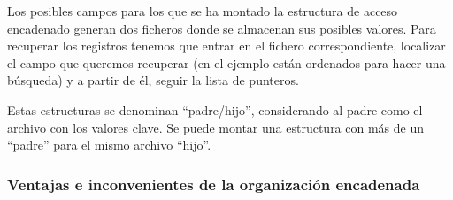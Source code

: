 \documentclass[10pt,a4paper,spanish]{report}
\begin{document}
Los posibles campos para los que se ha montado la estructura de acceso encadenado generan dos ficheros donde se almacenan sus posibles valores. Para recuperar los registros tenemos que entrar en el fichero correspondiente, localizar el campo que queremos recuperar (en el ejemplo están ordenados para hacer una búsqueda) y a partir de él, seguir la lista de punteros.

Estas estructuras se denominan ``padre/hijo'', considerando al padre como el archivo con los valores clave. Se puede montar una estructura con más de un ``padre'' para el mismo archivo ``hijo''.

\textcolor[rgb]{1,0.2,0.3}{\subsubsection{Ventajas e inconvenientes de la organización encadenada}}
\end{document}
